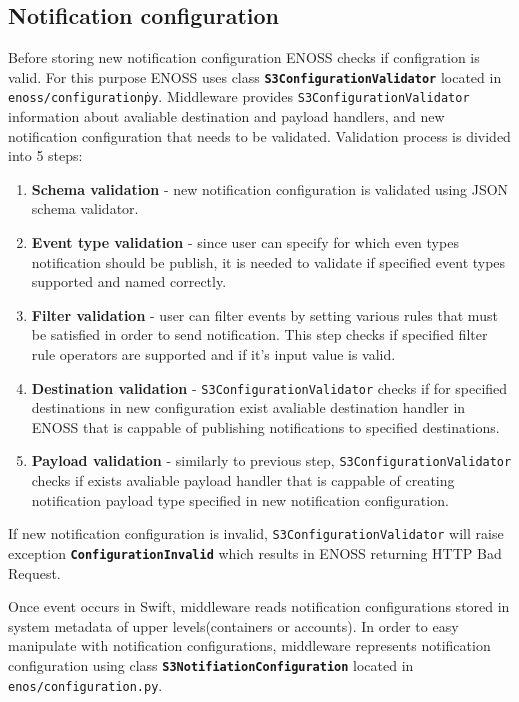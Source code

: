     \subsection{Notification configuration}
    Before storing new notification configuration ENOSS checks if configration is valid. For this purpose ENOSS uses class \textbf{\texttt{S3ConfigurationValidator}} located in \texttt{enoss/configuration\.py}. Middleware provides \texttt{S3ConfigurationValidator} information about avaliable destination and payload handlers, and new notification configuration that needs to be validated. Validation process is divided into 5 steps:
    \begin{enumerate}
        \item \textbf{Schema validation} - new notification configuration is validated using JSON schema validator.
        \item \textbf{Event type validation} - since user can specify for which even types notification should be publish, it is needed to validate if specified event types supported and named correctly.
        \item \textbf{Filter validation} - user can filter events by setting various rules that must be satisfied in order to send notification. This step checks if specified filter rule operators are supported and if it's input value is valid.
        \item \textbf{Destination validation} - \texttt{S3ConfigurationValidator} checks if for specified destinations in new configuration exist avaliable destination handler in ENOSS that is cappable of publishing notifications to specified destinations.
        \item \textbf{Payload validation} - similarly to previous step, \texttt{S3ConfigurationValidator} checks if exists avaliable payload handler that is cappable of creating notification payload type specified in new notification configuration.
    \end{enumerate}

    If new notification configuration is invalid, \texttt{S3ConfigurationValidator} will raise exception \textbf{\texttt{ConfigurationInvalid}} which results in ENOSS returning HTTP Bad Request.

    Once event occurs in Swift, middleware reads notification configurations stored in system metadata of upper levels(containers or accounts). In order to easy manipulate with notification configurations, middleware represents notification configuration using class \textbf{\texttt{S3NotifiationConfiguration}} located in \texttt{enos/configuration.py}.

